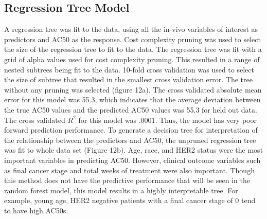 \documentclass[12pt]{article}
\begin{document}
\subsection{Regression Tree Model}
A regression tree was fit to the data, using all the in-vivo variables of interest as predictors and AC50 as the response.  Cost complexity pruning was used to select the size of the regression tree to fit to the data.  The regression tree was fit with a grid of alpha values used for cost complexity pruning. This resulted in a range of nested subtrees being fit to the data.  10-fold cross validation was used to select the size of subtree that resulted in the smallest cross validation error.  The tree without any pruning was selected (figure 12a). The cross validated absolute mean error for this model was 55.3, which indicates that the average deviation between the true AC50 values and the predicted AC50 values was 55.3 for held out data. The cross validated $R^2$ for this model was .0001.  Thus, the model has very poor forward prediction performance. To generate a decision tree for interpretation of the relationship between the predictors and AC50, the unpruned regression tree was fit to whole data set (Figure 12b). Age, race, and HER2 status were the most important variables in predicting AC50.  However, clinical outcome variables such as final cancer stage and total weeks of treatment were also important.  Though this method does not have the predictive performance that will be seen in the random forest model, this model results in a highly interpretable tree. For example, young age, HER2 negative patients with a final cancer stage of 0 tend to have high AC50s.  
\end{document}
